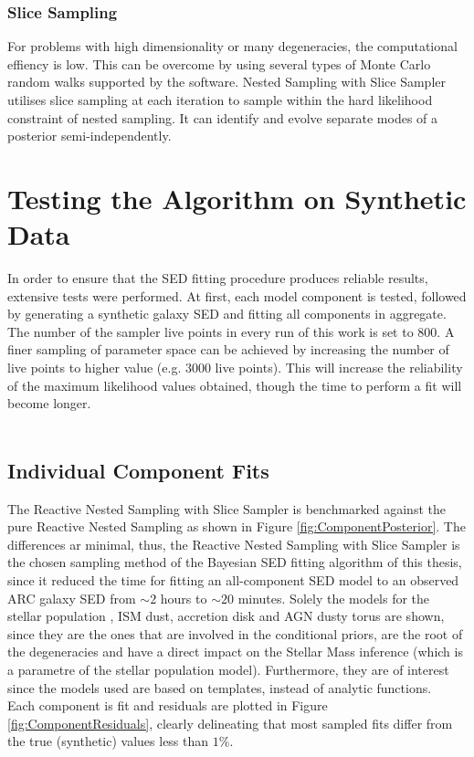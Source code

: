\subsubsection*{Slice Sampling}
For problems with high dimensionality or many degeneracies, the computational effiency is low. This can be overcome by using several types of Monte Carlo random walks supported by the  software.
Nested Sampling with Slice Sampler\cite{Handley2015} utilises slice sampling at each iteration to sample within the hard likelihood constraint of nested sampling. It can identify and evolve separate modes of a posterior semi-independently. 

\section{Testing the Algorithm on Synthetic Data}


In order to ensure that the SED fitting procedure produces reliable results, extensive tests were performed. At first, each model component is tested, followed by generating a synthetic galaxy SED and fitting all components in aggregate.\\
The number of the  sampler live points in every run of this work is set to $800$. A finer sampling of parameter space can be achieved by increasing the number of live points to higher value (e.g. 3000 live points).  This will increase the reliability of the maximum likelihood values obtained, though the time to perform a fit will become longer.\\ \\
\subsection*{Individual Component Fits}
The Reactive Nested Sampling with Slice Sampler is benchmarked against the pure Reactive Nested Sampling as shown in Figure \ref{fig:ComponentPosterior}. The differences ar minimal, thus, the Reactive Nested Sampling with Slice Sampler is the chosen sampling method of the Bayesian SED fitting algorithm of this thesis, since it reduced the time for fitting an all-component SED model to an observed ARC galaxy SED from $\sim 2$ hours to $\sim 20$ minutes. Solely the models for the stellar population , ISM dust, accretion disk and AGN dusty torus are shown, since they are the ones that are involved in the conditional priors, are the root of the degeneracies and have a direct impact on the Stellar Mass inference (which is a parametre of the stellar population model). Furthermore, they are of interest since the models used are based on templates, instead of analytic functions.\\
Each component is fit and residuals are plotted in Figure \ref{fig:ComponentResiduals}, clearly delineating that most sampled fits differ from the true (synthetic) values less than $1\%$.

